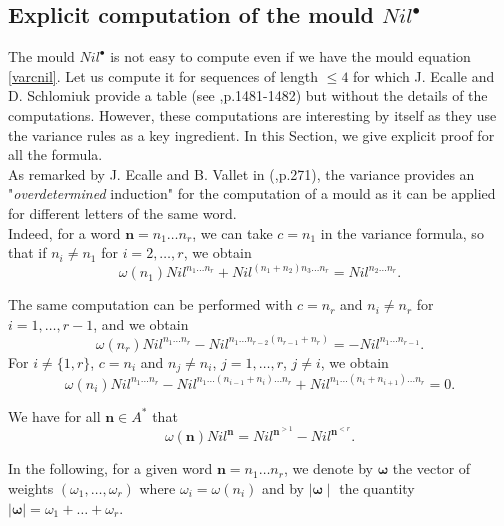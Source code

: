 \documentclass[english,11pt]{amsart}
\def\nn{\mathbf{n}}
\def\nn{\mathbf{n}}
\def\oo{\boldsymbol\omega}
\begin{document}
\subsection{Explicit computation of the mould $Nil^{\bullet}$}

The mould $Nil^{\bullet}$ is not easy to compute even if we have the mould equation \eqref{varcnil}. Let us compute it for sequences of length $\leq 4$ for which J. Ecalle and D. Schlomiuk provide a table (see \cite{es},p.1481-1482) but without the details of the computations. However, these computations are interesting by itself as they use the variance rules as a key ingredient. In this Section, we give explicit proof for all the formula.\\


As remarked by J. Ecalle and B. Vallet in (\cite{ev},p.271), the variance provides an "{\it overdetermined} induction" for the computation of a mould as it can be applied for different letters of the same word. \\

Indeed, for a word $\nn =n_1 \dots n_r$, we can take $c=n_1$ in the variance formula, so that if $n_i\not= n_1$ for $i=2,\dots ,r$, we obtain
\begin{equation}
\label{cal1}
    \omega (n_1) Nil^{n_1 \dots n_r} +Nil^{(n_1 +n_2) n_3 \dots n_r} = Nil^{n_2 \dots n_r} .
\end{equation}

The same computation can be performed with $c=n_r$ and $n_i\not= n_r$ for $i=1,\dots ,r-1$, and we obtain 
\begin{equation}
\label{calr}
\omega (n_r) Nil^{n_1 \dots n_r} -Nil^{n_1 \dots n_{r-2} (n_{r-1} +n_r)} = -Nil^{n_1 \dots n_{r-1}} .
\end{equation}
For $i\not= \{ 1,r \}$, $c=n_i$ and $n_j\not =n_i$, $j=1,\dots ,r$, $j\not= i$, we obtain 
\begin{equation}
\label{cali}
\omega (n_i) Nil^{n_1 \dots n_r} -Nil^{n_1 \dots (n_{i-1} +n_i ) \dots n_r} +Nil^{n_1 \dots (n_i +n_{i+1}) \dots n_r} = 0 .
\end{equation}

We have for all $\nn \in A^*$ that 
\begin{equation}
    \omega (\nn) Nil^{\nn} = Nil^{\nn^{>1}} - Nil^{\nn^{<r}} .
\end{equation}

In the following, for a given word $\nn =n_1 \dots n_r$, we denote by $\oo$ the vector of weights $(\omega_1 ,\dots ,\omega_r )$ where $\omega_i =\omega (n_i )$ and by $\mid \oo \mid$ the quantity $\mid \oo\mid  = \omega_1 +\dots +\omega_r$.
\end{document}
